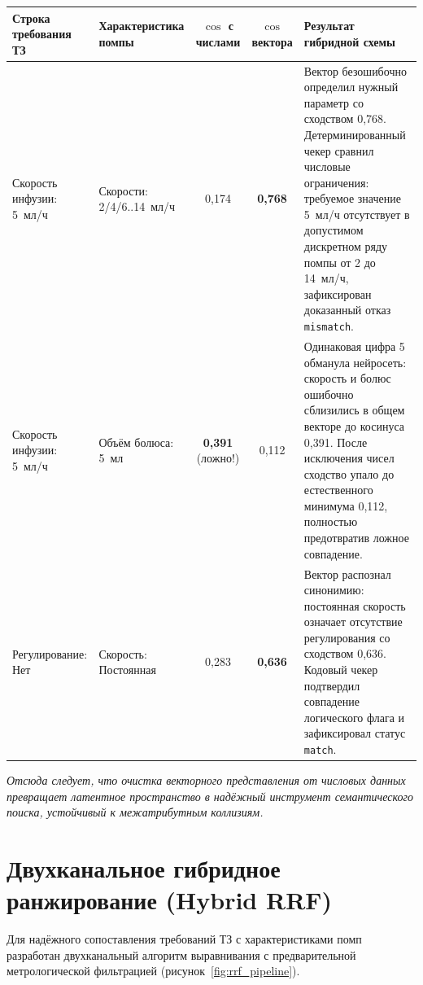 \documentclass[10pt,a4paper]{article}
\begin{document}
\vspace{0.1em}
\noindent\begin{minipage}{\textwidth}
\centering
\small
\renewcommand{\arraystretch}{0.85}
\label{tab:cosine_demo}
\begin{tabularx}{\textwidth}{>{\raggedright\arraybackslash}p{3.5cm} >{\raggedright\arraybackslash}p{3.8cm} c c Y}
\toprule
\textbf{Строка требования ТЗ} & \textbf{Характеристика помпы} & \textbf{$\cos$ с числами} & \textbf{$\cos$ вектора} & \textbf{Результат гибридной схемы} \\
\midrule
Скорость инфузии: 5~мл/ч & Скорости: 2/4/6..14~мл/ч & 0,174 & \textbf{0,768} & Вектор безошибочно определил нужный параметр со сходством 0,768. Детерминированный чекер сравнил числовые ограничения: требуемое значение 5~мл/ч отсутствует в допустимом дискретном ряду помпы от 2 до 14~мл/ч, зафиксирован доказанный отказ \texttt{mismatch}. \\
Скорость инфузии: 5~мл/ч & Объём болюса: 5~мл & \textbf{0,391} (ложно!) & 0,112 & Одинаковая цифра 5 обманула нейросеть: скорость и болюс ошибочно сблизились в общем векторе до косинуса 0,391. После исключения чисел сходство упало до естественного минимума 0,112, полностью предотвратив ложное совпадение. \\
Регулирование: Нет & Скорость: Постоянная & 0,283 & \textbf{0,636} & Вектор распознал синонимию: постоянная скорость означает отсутствие регулирования со сходством 0,636. Кодовый чекер подтвердил совпадение логического флага и зафиксировал статус \texttt{match}. \\
\bottomrule
\end{tabularx}
\end{minipage}

\vspace{0.2em}
\emph{Отсюда следует, что очистка векторного представления от числовых данных превращает латентное пространство в надёжный инструмент семантического поиска, устойчивый к межатрибутным коллизиям.}

\newpage
\section{Двухканальное гибридное ранжирование (Hybrid RRF)}

Для надёжного сопоставления требований ТЗ с характеристиками помп разработан двухканальный алгоритм выравнивания с предварительной метрологической фильтрацией (рисунок~\ref{fig:rrf_pipeline}).
\end{document}
